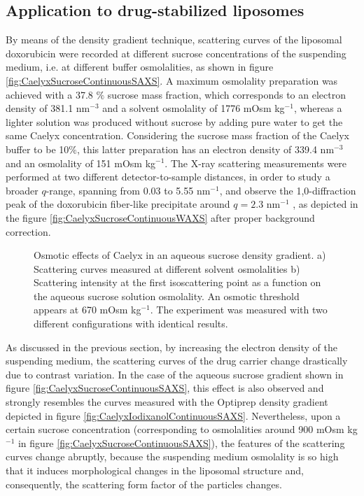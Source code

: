 \subsection{Application to drug-stabilized liposomes}
\label{sec:OsmoticCaelyx}
By means of the density gradient technique, scattering curves of the liposomal doxorubicin were recorded at different sucrose concentrations of the suspending medium, i.e. at different buffer osmolalities, as shown in figure \ref{fig:CaelyxSucroseContinuousSAXS}. A maximum osmolality preparation was achieved with a 37.8 $\%$ sucrose mass fraction, which corresponds to an electron density of 381.1 nm$^{-3}$ and a solvent osmolality of 1776 mOsm kg$^{-1}$,  whereas a lighter solution was produced without sucrose by adding pure water to get the same Caelyx concentration. Considering the sucrose mass fraction of the Caelyx buffer to be 10$\%$, this latter preparation has an electron density of 339.4 nm$^{-3}$ and an osmolality of 151 mOsm kg$^{-1}$. The X-ray scattering measurements were performed at two different detector-to-sample distances, in order to study a broader $q$-range, spanning from 0.03 to 5.55 nm$^{-1}$, and observe the 1,0-diffraction peak of the doxorubicin fiber-like precipitate around $q=2.3$ nm$^{-1}$ \citep{li_doxorubicin_1998}, as depicted in the figure \ref{fig:CaelyxSucroseContinuousWAXS} after proper background correction.

\begin{figure}
	\centering
		\qquad
		\caption[Osmotic effects of Caelyx in an aqueous sucrose density gradient.]{Osmotic effects of Caelyx in an aqueous sucrose density gradient. a) Scattering curves measured at different solvent osmolalities  b) Scattering intensity at the first isoscattering point as a function on the aqueous sucrose solution osmolality. An osmotic threshold appears at 670 mOsm kg$^{-1}$. The experiment was measured with two different configurations with identical results.}
\end{figure}

As discussed in the previous section, by increasing the electron density of the suspending medium, the scattering curves of the drug carrier change drastically due to contrast variation. In the case of the aqueous sucrose gradient shown in figure \ref{fig:CaelyxSucroseContinuousSAXS}, this effect is also observed and strongly resembles the curves measured with the Optiprep density gradient depicted in figure \ref{fig:CaelyxIodixanolContinuousSAXS}. Nevertheless, upon a certain sucrose concentration (corresponding to osmolalities around 900 mOsm kg$^{-1}$ in figure \ref{fig:CaelyxSucroseContinuousSAXS}), the features of the scattering curves change abruptly, because the suspending medium osmolality is so high that it induces morphological changes in the liposomal structure and, consequently, the scattering form factor of the particles changes.


